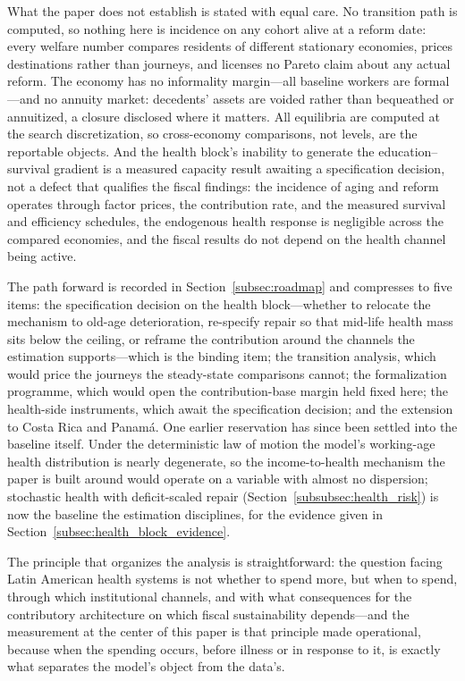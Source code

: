 \documentclass[12pt,a4paper]{article}
\begin{document}
What the paper does not establish is stated with equal care. No transition path is computed, so nothing here is incidence on any cohort alive at a reform date: every welfare number compares residents of different stationary economies, prices destinations rather than journeys, and licenses no Pareto claim about any actual reform. The economy has no informality margin---all baseline workers are formal---and no annuity market: decedents' assets are voided rather than bequeathed or annuitized, a closure disclosed where it matters. All equilibria are computed at the search discretization, so cross-economy comparisons, not levels, are the reportable objects. And the health block's inability to generate the education--survival gradient is a measured capacity result awaiting a specification decision, not a defect that qualifies the fiscal findings: the incidence of aging and reform operates through factor prices, the contribution rate, and the measured survival and efficiency schedules, the endogenous health response is negligible across the compared economies, and the fiscal results do not depend on the health channel being active.

The path forward is recorded in Section~\ref{subsec:roadmap} and compresses to five items: the specification decision on the health block---whether to relocate the mechanism to old-age deterioration, re-specify repair so that mid-life health mass sits below the ceiling, or reframe the contribution around the channels the estimation supports---which is the binding item; the transition analysis, which would price the journeys the steady-state comparisons cannot; the formalization programme, which would open the contribution-base margin held fixed here; the health-side instruments, which await the specification decision; and the extension to Costa Rica and Panam\'a. One earlier reservation has since been settled into the baseline itself. Under the deterministic law of motion the model's working-age health distribution is nearly degenerate, so the income-to-health mechanism the paper is built around would operate on a variable with almost no dispersion; stochastic health with deficit-scaled repair (Section~\ref{subsubsec:health_risk}) is now the baseline the estimation disciplines, for the evidence given in Section~\ref{subsec:health_block_evidence}.

The principle that organizes the analysis is straightforward: the question facing Latin American health systems is not whether to spend more, but when to spend, through which institutional channels, and with what consequences for the contributory architecture on which fiscal sustainability depends---and the measurement at the center of this paper is that principle made operational, because when the spending occurs, before illness or in response to it, is exactly what separates the model's object from the data's.
\end{document}
